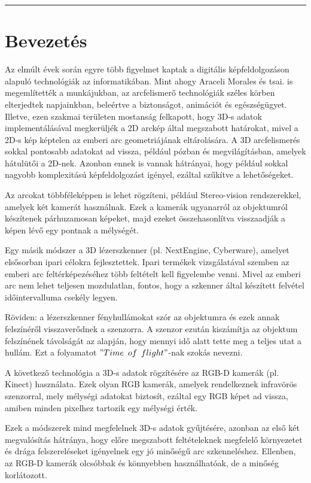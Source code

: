 \documentclass[12pt,a4]{article}
\begin{document}
	\par\noindent\rule{\textwidth}{0.4pt}

    \section{Bevezetés}
        Az elmúlt évek során egyre több figyelmet kaptak a digitális képfeldolgozáson alapuló technológiák az informatikában. 
        Mint ahogy \cite{survey}Araceli Morales és tsai. is megemlítették a munkájukban, az arcfelismerő technológiák széles körben elterjedtek napjainkban, beleértve a biztonságot, animációt és egészségügyet. 
        Illetve, ezen szakmai területen mostanság felkapott, hogy 3D-s adatok implementálásával megkerüljék a 2D arckép által megszabott határokat, mivel a 2D-s kép képtelen az emberi arc geometriájának eltárolására.
        A 3D arcfelismerés sokkal pontosabb adatokat ad vissza, például pózban és megvilágításban, amelyek hátulütői a 2D-nek. Azonban ennek is vannak hátrányai, hogy például sokkal nagyobb komplexitású képfeldolgozást igényel, ezáltal szűkítve a lehetőségeket.

        Az arcokat többféleképpen is lehet rögzíteni, például Stereo-vision rendszerekkel, amelyek két kamerát használnak. Ezek a kamerák ugyanarról az objektumról készítenek párhuzamosan képeket, majd ezeket összehasonlítva visszaadják a képen lévő egy pontnak a mélységét.

        Egy másik módszer a 3D lézerszkenner (pl. NextEngine, Cyberware), amelyet elsősorban ipari célokra fejlesztettek. Ipari termékek vizsgálatával szemben az emberi arc feltérképezéséhez több feltételt kell figyelembe venni. Mivel az emberi arc nem lehet teljesen mozdulatlan, fontos, hogy a szkenner által készített felvétel időintervalluma csekély legyen.

        Röviden: a lézerszkenner fényhullámokat szór az objektumra és ezek annak felszínéről visszaverődnek a szenzorra. A szenzor ezután kiszámítja az objektum felszínének távolságát az alapján, hogy mennyi idő alatt tette meg a teljes utat a hullám. Ezt a folyamatot $"Time\enspace of\enspace flight"$-nak szokás nevezni.

        A következő technológia a 3D-s adatok rögzítésére az RGB-D kamerák (pl. Kinect) használata. Ezek olyan RGB kamerák, amelyek rendelkeznek infravörös szenzorral, mely mélységi adatokat biztosít, ezáltal egy RGB képet ad vissza, amiben minden pixelhez tartozik egy mélységi érték.

        Ezek a módszerek mind megfelelnek 3D-s adatok gyűjtésére, azonban az első két megvalósítás hátránya, hogy előre megszabott feltételeknek megfelelő környezetet és drága felszereléseket igényelnek egy jó minőségű arc szkenneléshez. Ellenben, az RGB-D kamerák olcsóbbak és könnyebben használhatóak, de a minőség korlátozott.
\end{document}
